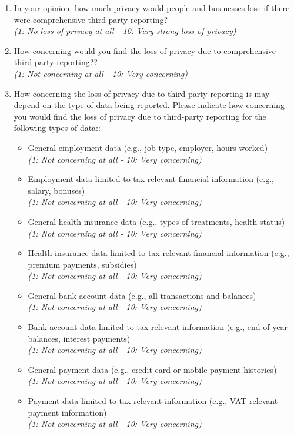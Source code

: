 \documentclass[11pt]{article}
\begin{document}
\begin{enumerate}[resume]
    \item In your opinion, how much privacy would people and businesses lose if there were comprehensive third-party reporting?\\
    \textit{(1: No loss of privacy at all - 10: Very strong loss of privacy)}
    \item How concerning would you find the loss of privacy due to comprehensive third-party reporting??\\
    \textit{(1: Not concerning at all - 10: Very concerning)}
    \item How concerning the loss of privacy due to third-party reporting is may depend on the type of data being reported. Please indicate how concerning you would find the loss of privacy due to third-party reporting for the following types of data::
    \begin{itemize}
        \item General employment data (e.g., job type, employer, hours worked)\\
        \textit{(1: Not concerning at all - 10: Very concerning)}
        \item Employment data limited to tax-relevant financial information (e.g., salary, bonuses)\\
        \textit{(1: Not concerning at all - 10: Very concerning)}

        \item General health insurance data (e.g., types of treatments, health status)\\
        \textit{(1: Not concerning at all - 10: Very concerning)}

        \item Health insurance data limited to tax-relevant financial information (e.g., premium payments, subsidies)\\
        \textit{(1: Not concerning at all - 10: Very concerning)}

        \item General bank account data (e.g., all transactions and balances)\\
        \textit{(1: Not concerning at all - 10: Very concerning)}

        \item Bank account data limited to tax-relevant information (e.g., end-of-year balances, interest payments)\\
        \textit{(1: Not concerning at all - 10: Very concerning)}

        \item General payment data (e.g., credit card or mobile payment histories)\\
        \textit{(1: Not concerning at all - 10: Very concerning)}

        \item Payment data limited to tax-relevant information (e.g., VAT-relevant payment information)\\
        \textit{(1: Not concerning at all - 10: Very concerning)}
    \end{itemize}
\end{enumerate}
\end{document}
